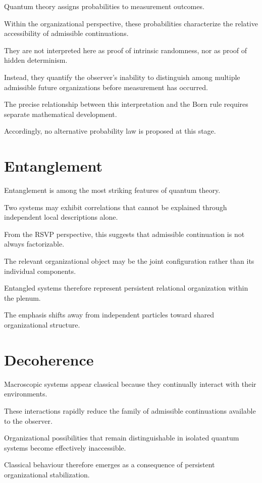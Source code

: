 \documentclass[11pt,oneside]{book}
\numberwithin{equation}{chapter}
\theoremstyle{definition}
\theoremstyle{plain}
\begin{document}
Quantum theory assigns probabilities to measurement outcomes.

Within the organizational perspective, these probabilities characterize the
relative accessibility of admissible continuations.

They are not interpreted here as proof of intrinsic randomness, nor as proof
of hidden determinism.

Instead, they quantify the observer's inability to distinguish among
multiple admissible future organizations before measurement has occurred.

The precise relationship between this interpretation and the Born rule
requires separate mathematical development.

Accordingly, no alternative probability law is proposed at this stage.

\section{Entanglement}

Entanglement is among the most striking features of quantum theory.

Two systems may exhibit correlations that cannot be explained through
independent local descriptions alone.

From the RSVP perspective, this suggests that admissible continuation is not
always factorizable.

The relevant organizational object may be the joint configuration rather
than its individual components.

Entangled systems therefore represent persistent relational organization
within the plenum.

The emphasis shifts away from independent particles toward shared
organizational structure.

\section{Decoherence}

Macroscopic systems appear classical because they continually interact with
their environments.

These interactions rapidly reduce the family of admissible continuations
available to the observer.

Organizational possibilities that remain distinguishable in isolated quantum
systems become effectively inaccessible.

Classical behaviour therefore emerges as a consequence of persistent
organizational stabilization.
\end{document}
